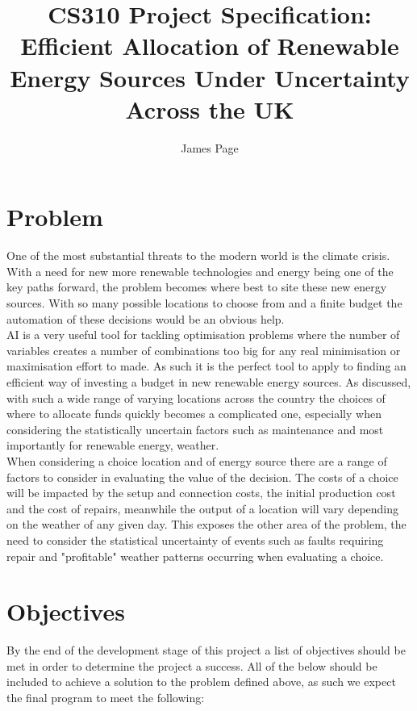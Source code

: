 \documentclass[twoside]{article}
\title{\myfont CS310 Project Specification:\\ \myfon Efficient Allocation of Renewable Energy Sources Under Uncertainty Across the UK} %
\author{James Page}
\begin{document}
\maketitle

\section{Problem}
One of the most substantial threats to the modern world is the climate crisis. With a need for new more renewable technologies and energy being one of the key paths forward, the problem becomes where best to site these new energy sources. With so many possible locations to choose from and a finite budget the automation of these decisions would be an obvious help.\\
\noindent
AI is a very useful tool for tackling optimisation problems where the number of variables creates a number of combinations too big for any real minimisation or maximisation effort to made. As such it is the perfect tool to apply to finding an efficient way of investing a budget in new renewable energy sources. As discussed, with such a wide range of varying locations across the country  the choices of where to allocate funds quickly becomes a complicated one, especially when considering the statistically uncertain factors such as maintenance and most importantly for renewable energy, weather. \\
\noindent
When considering a choice location and of energy source there are a range of factors to consider in evaluating the value of the decision. The costs of a choice will be impacted by the setup and connection costs, the initial production cost and the cost of repairs, meanwhile the output of a location will vary depending on the weather of any given day. This exposes the other area of the problem, the need to consider the statistical uncertainty of events such as faults requiring repair and "profitable" weather patterns occurring when evaluating a choice.


\section{Objectives}

By the end of the development stage of this project a list of objectives should be met in order to determine the project a success. All of the below should be included to achieve a solution to the problem defined above, as such we expect the final program to meet the following:
\end{document}
